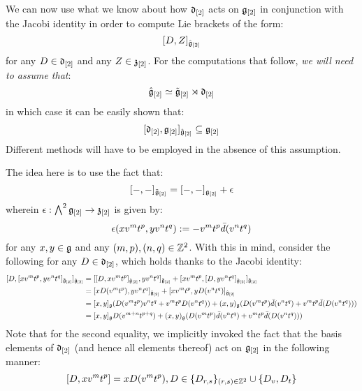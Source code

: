         \begin{remark} \label{remark: derivation_action_on_toroidal_centres}
            We can now use what we know about how $\mathfrak{d}_{[2]}$ acts on $\mathfrak{g}_{[2]}$ in conjunction with the Jacobi identity in order to compute Lie brackets of the form:
                $$[D, Z]_{\hat{\mathfrak{g}}_{[2]}}$$
            for any $D \in \mathfrak{d}_{[2]}$ and any $Z \in \mathfrak{z}_{[2]}$. For the computations that follow, \textit{we will need to assume that}:
                $$\hat{\mathfrak{g}}_{[2]} \simeq \tilde{\mathfrak{g}}_{[2]}\rtimes \mathfrak{d}_{[2]}$$
            in which case it can be easily shown that:
                $$[\mathfrak{d}_{[2]}, \mathfrak{g}_{[2]}]_{\hat{\mathfrak{g}}_{[2]}} \subseteq \mathfrak{g}_{[2]}$$
            Different methods will have to be employed in the absence of this assumption.

            The idea here is to use the fact that:
                $$[-, -]_{\tilde{\mathfrak{g}}_{[2]}} = [-, -]_{\mathfrak{g}_{[2]}} + \epsilon$$
            wherein $\epsilon: \bigwedge^2 \mathfrak{g}_{[2]} \to \mathfrak{z}_{[2]}$ is given by:
                $$\epsilon(x v^m t^p, y v^n t^q) := -v^m t^p \bar{d}(v^n t^q)$$
            for any $x, y \in \mathfrak{g}$ and any $(m, p), (n, q) \in \mathbb{Z}^2$. With this in mind, consider the following for any $D \in \mathfrak{d}_{[2]}$, which holds thanks to the Jacobi identity:
                $$
                    \begin{aligned}
                        [ D, [x v^m t^p, y v^n t^q]_{\tilde{\g}_{[2]}} ]_{\hat{\g}_{[2]}} & = [ [D, x v^m t^p]_{\hat{\g}_{[2]}}, y v^n t^q ]_{\tilde{\g}_{[2]}} + [ x v^m t^p, [D, y v^n t^q]_{\hat{\g}_{[2]}} ]_{\tilde{\g}_{[2]}}
                        \\
                        & = [x D(v^m t^p), y v^n t^q]_{\hat{\g}_{[2]}} + [x v^m t^p, y D(v^n t^q)]_{\hat{\g}_{[2]}}
                        \\
                        & = [x, y]_{\g} (D(v^m t^p) v^n t^q + v^m t^p D(v^n t^q)) + (x, y)_{\g} ( D(v^m t^p) \bar{d}(v^n t^q) + v^m t^p \bar{d}(D(v^n t^q)) )
                        \\
                        & = [x, y]_{\g} D(v^{m + n} t^{p + q}) + (x, y)_{\g} ( D(v^m t^p) \bar{d}(v^n t^q) + v^m t^p \bar{d}(D(v^n t^q)) )
                    \end{aligned}
                $$
            Note that for the second equality, we implicitly invoked the fact that the basis elements of $\mathfrak{d}_{[2]}$ (and hence all elements thereof) act on $\mathfrak{g}_{[2]}$ in the following manner:
                $$[D, x v^m t^p] = x D(v^m t^p), D \in \{D_{r, s}\}_{(r, s) \in \mathbb{Z}^2} \cup \{D_v, D_t\}$$

\end{remark}
